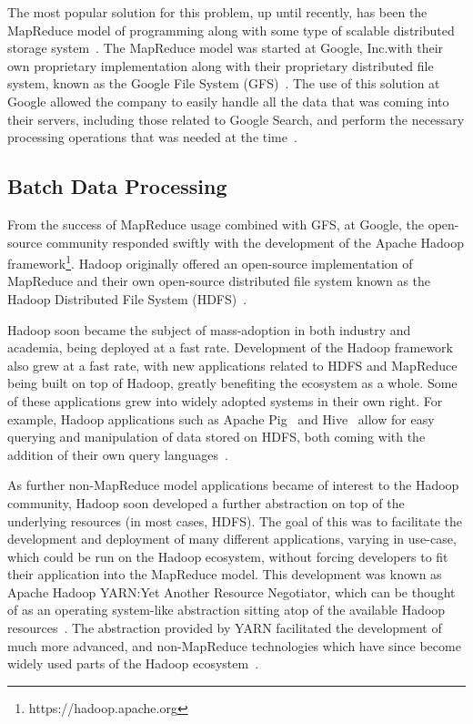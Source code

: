 The most popular solution for this problem, up until recently, has been the MapReduce %
 model of programming along with
some type of scalable distributed storage system~\cite{bifet_mining_2013}. The MapReduce model was started at Google,
Inc.\@ with their own proprietary implementation along with their proprietary distributed file system, known as the Google
File System (GFS)~\cite{ghemawat_google_2003}. The use of this solution at Google
allowed the company to easily handle all the data that was coming into their servers, including those related to Google Search, and perform the necessary
processing operations that was needed at the time~\cite{ghemawat_google_2003,dean_mapreduce:_2008}.


\subsection{Batch Data Processing} %
\label{sub:apache hadoop}

From the success of MapReduce usage combined with GFS, at Google, the open-source community responded swiftly with the
development of the Apache Hadoop framework\footnote{https://hadoop.apache.org}. Hadoop originally offered an open-source
implementation of MapReduce and their own open-source distributed file system known as the Hadoop Distributed File System
(HDFS)~\cite{shvachko_hadoop_2010}.

Hadoop soon became the subject of mass-adoption in both industry and academia, being deployed at a fast rate.
Development of the Hadoop framework also grew at a fast rate, with new applications related to HDFS and MapReduce being
built on top of Hadoop, greatly benefiting the ecosystem as a whole. Some of these applications grew into widely adopted
systems in their own right. For example, Hadoop applications such as Apache Pig~\cite{gates2009building} and
Hive~\cite{thusoo2010hive} allow for easy querying and manipulation of data stored on HDFS, both coming with the
addition of their own query languages~\cite{olston_pig_2008}.

As further non-MapReduce model applications became of interest to the Hadoop community, Hadoop soon
developed a further abstraction on top of the underlying resources (in most cases, HDFS). The goal of this was to
facilitate the development and deployment of many different applications, varying in use-case, which could be run on the
Hadoop ecosystem, without forcing developers to fit their application into the MapReduce model. This development was
known as Apache Hadoop YARN:\@ Yet Another Resource Negotiator, which can be thought of as an operating system-like abstraction sitting
atop of the available Hadoop resources~\cite{vavilapalli_apache_2013}. The abstraction provided by YARN facilitated the
development of much more advanced, and non-MapReduce technologies which have since become widely used parts of the
Hadoop ecosystem~\cite{harrison_hadoops_2012}.

